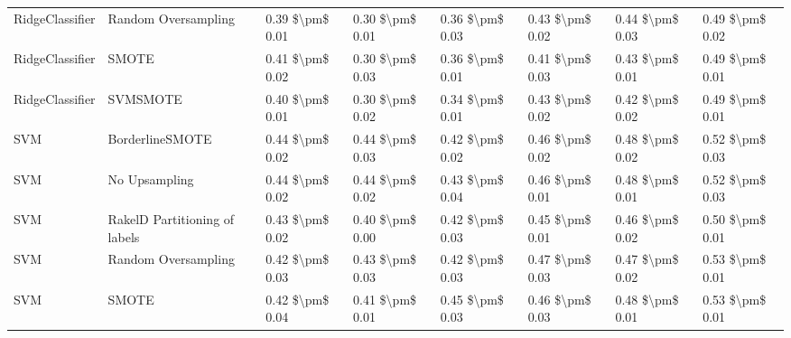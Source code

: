 \begin{tabular}{llllllll}
                RidgeClassifier &           Random Oversampling & 0.39 \$\textbackslash pm\$ 0.01 &           0.30 \$\textbackslash pm\$ 0.01 &       0.36 \$\textbackslash pm\$ 0.03 &        0.43 \$\textbackslash pm\$ 0.02 &                         0.44 \$\textbackslash pm\$ 0.03 &     0.49 \$\textbackslash pm\$ 0.02 \\
                RidgeClassifier &                         SMOTE & 0.41 \$\textbackslash pm\$ 0.02 &           0.30 \$\textbackslash pm\$ 0.03 &       0.36 \$\textbackslash pm\$ 0.01 &        0.41 \$\textbackslash pm\$ 0.03 &                         0.43 \$\textbackslash pm\$ 0.01 &     0.49 \$\textbackslash pm\$ 0.01 \\
                RidgeClassifier &                      SVMSMOTE & 0.40 \$\textbackslash pm\$ 0.01 &           0.30 \$\textbackslash pm\$ 0.02 &       0.34 \$\textbackslash pm\$ 0.01 &        0.43 \$\textbackslash pm\$ 0.02 &                         0.42 \$\textbackslash pm\$ 0.02 &     0.49 \$\textbackslash pm\$ 0.01 \\
                            SVM &               BorderlineSMOTE & 0.44 \$\textbackslash pm\$ 0.02 &           0.44 \$\textbackslash pm\$ 0.03 &       0.42 \$\textbackslash pm\$ 0.02 &        0.46 \$\textbackslash pm\$ 0.02 &                         0.48 \$\textbackslash pm\$ 0.02 &     0.52 \$\textbackslash pm\$ 0.03 \\
                            SVM &                 No Upsampling & 0.44 \$\textbackslash pm\$ 0.02 &           0.44 \$\textbackslash pm\$ 0.02 &       0.43 \$\textbackslash pm\$ 0.04 &        0.46 \$\textbackslash pm\$ 0.01 &                         0.48 \$\textbackslash pm\$ 0.01 &     0.52 \$\textbackslash pm\$ 0.03 \\
                            SVM & RakelD Partitioning of labels & 0.43 \$\textbackslash pm\$ 0.02 &           0.40 \$\textbackslash pm\$ 0.00 &       0.42 \$\textbackslash pm\$ 0.03 &        0.45 \$\textbackslash pm\$ 0.01 &                         0.46 \$\textbackslash pm\$ 0.02 &     0.50 \$\textbackslash pm\$ 0.01 \\
                            SVM &           Random Oversampling & 0.42 \$\textbackslash pm\$ 0.03 &           0.43 \$\textbackslash pm\$ 0.03 &       0.42 \$\textbackslash pm\$ 0.03 &        0.47 \$\textbackslash pm\$ 0.03 &                         0.47 \$\textbackslash pm\$ 0.02 &     0.53 \$\textbackslash pm\$ 0.01 \\
                            SVM &                         SMOTE & 0.42 \$\textbackslash pm\$ 0.04 &           0.41 \$\textbackslash pm\$ 0.01 &       0.45 \$\textbackslash pm\$ 0.03 &        0.46 \$\textbackslash pm\$ 0.03 &                         0.48 \$\textbackslash pm\$ 0.01 &     0.53 \$\textbackslash pm\$ 0.01 \\

\end{tabular}
